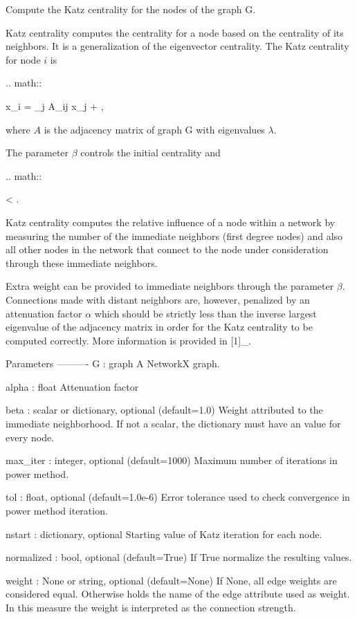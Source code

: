 \begin{DoxyVerb}Compute the Katz centrality for the nodes of the graph G.

Katz centrality computes the centrality for a node based on the centrality
of its neighbors. It is a generalization of the eigenvector centrality. The
Katz centrality for node $i$ is

.. math::

    x_i = \alpha \sum_{j} A_{ij} x_j + \beta,

where $A$ is the adjacency matrix of graph G with eigenvalues $\lambda$.

The parameter $\beta$ controls the initial centrality and

.. math::

    \alpha < .

Katz centrality computes the relative influence of a node within a
network by measuring the number of the immediate neighbors (first
degree nodes) and also all other nodes in the network that connect
to the node under consideration through these immediate neighbors.

Extra weight can be provided to immediate neighbors through the
parameter $\beta$.  Connections made with distant neighbors
are, however, penalized by an attenuation factor $\alpha$ which
should be strictly less than the inverse largest eigenvalue of the
adjacency matrix in order for the Katz centrality to be computed
correctly. More information is provided in [1]_.

Parameters
----------
G : graph
  A NetworkX graph.

alpha : float
  Attenuation factor

beta : scalar or dictionary, optional (default=1.0)
  Weight attributed to the immediate neighborhood. If not a scalar, the
  dictionary must have an value for every node.

max_iter : integer, optional (default=1000)
  Maximum number of iterations in power method.

tol : float, optional (default=1.0e-6)
  Error tolerance used to check convergence in power method iteration.

nstart : dictionary, optional
  Starting value of Katz iteration for each node.

normalized : bool, optional (default=True)
  If True normalize the resulting values.

weight : None or string, optional (default=None)
  If None, all edge weights are considered equal.
  Otherwise holds the name of the edge attribute used as weight.
  In this measure the weight is interpreted as the connection strength.


\end{DoxyVerb}

